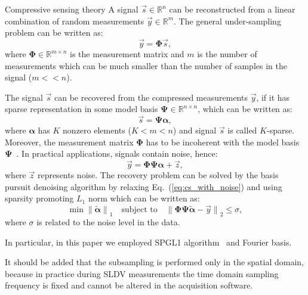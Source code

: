 \documentclass[10pt,aspectratio=169,dvipsnames]{beamer} %
\newcommand{\bs}[1]{\boldsymbol{#1}}
\begin{document}
	\begin{frame}{Compressive sensing theory}
		\tiny
		A signal $\vec{s}\in \mathbb{R}^n$ can be reconstructed from a linear combination of random measurements $\vec{y} \in \mathbb{R}^m$.
		The general under-sampling problem can be written as:
		\begin{equation}
			\vec{y} = \bs{\Phi} \vec{s},
		\end{equation}
		where $\bs{\Phi} \in \mathbb{R}^{m\times n}$ is the measurement matrix and $m$ is the number of measurements which can be much smaller than the number of samples in the signal ($m<<n$).
		
		The signal $\vec{s}$ can be recovered from the compressed measurements $\vec{y}$, if it has sparse representation in some model basis $\bs{\Psi} \in \mathbb{R}^{n\times n}$, which can be written as:
		\begin{equation}
			\vec{s} = \bs{\Psi} \bs{\alpha},
		\end{equation}
		where $\bs{\alpha}$ has $K$ nonzero elements ($K<m<n$) and signal $\vec{s}$ is called $K$-sparse. 
		Moreover, the measurement matrix $\bs{\Phi}$ has to be incoherent with the model basis $\bs{\Psi}$~\cite{Candes2007}.
		In practical applications, signals contain noise, hence:
		\begin{equation}
			\vec{y} = \bs{\Phi} \bs{\Psi} \bs{\alpha} + \vec{z},
			\label{eq:cs_with_noise}
		\end{equation}
		where $\vec{z}$ represents noise.
		The recovery problem can be solved by the basis pursuit denoising algorithm by relaxing Eq.~(\ref{eq:cs_with_noise}) and using sparsity promoting $L_1$ norm which can be written as:
		\begin{equation}
			\min{\lVert \tilde{\bs{\alpha}} \rVert}_1 \quad \textrm{subject to} \quad {\lVert \bs{\Phi} \bs{\Psi} \tilde{\bs{\alpha}} -\vec{y} \rVert}_2 \leq \sigma ,
		\end{equation}
		where $\sigma$ is related to the noise level in the data.
		
		In particular, in this paper we employed SPGL1 algorithm~\cite{VandenBerg2019} and Fourier basis.
		
		It should be added that the subsampling is performed only in the spatial domain, because in practice during SLDV measurements the time domain sampling frequency is fixed and cannot be altered in the acquisition software. 	
	\end{frame}
	
\end{document}
